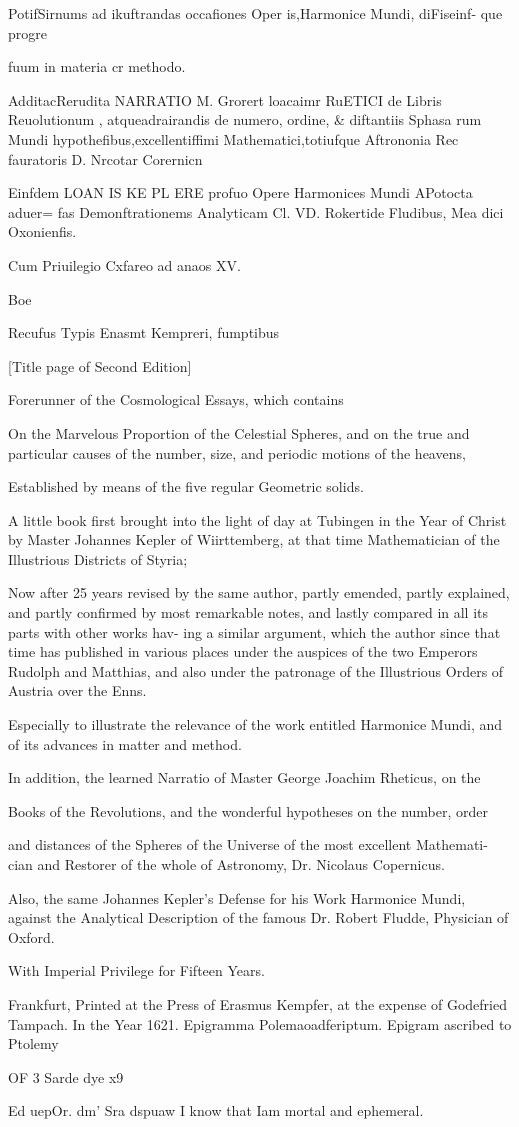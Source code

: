 \documentclass{article}
\begin{document}
PotifSirnums ad ikuftrandas occafiones Oper is,Harmonice Mundi, diFiseinf-
que progre{fuum in materia cr methodo.

AdditacRerudita NARRATIO M. Grorert loacaimr RuETICI de
Libris Reuolutionum , atqueadrairandis de numero, ordine, & diftantiis Sphasa
rum Mundi hypothefibus,excellentiffimi Mathematici,totiufque Aftrononia Rec
fauratoris D. Nrcotar Corernicn


Einfdem LOAN IS KE PL ERE profuo Opere Harmonices Mundi APotocta aduer=
fas Demonftrationems Analyticam Cl. VD. Rokertide Fludibus, Mea
dici Oxonienfis.

Cum Priuilegio Cxfareo ad anaos XV.

Boe

Recufus Typis Enasmt Kempreri, fumptibus


[Title page of Second Edition]

Forerunner of the Cosmological Essays, which contains


On the Marvelous Proportion of the Celestial Spheres, and on
the true and particular causes of the number, size, and periodic
motions of the heavens,

Established by means of the five regular Geometric solids.

A little book first brought into the light of day at Tubingen in the Year of Christ
by
Master Johannes Kepler of Wiirttemberg, at that time
Mathematician of the Illustrious Districts of Styria;

Now after 25 years revised by the same author, partly emended,
partly explained, and partly confirmed by most remarkable
notes, and lastly compared in all its parts with other works hav-
ing a similar argument, which the author since that time has
published in various places under the auspices of the two
Emperors Rudolph and Matthias, and also under the patronage
of the Illustrious Orders of Austria over the Enns.

Especially to illustrate the relevance of the work entitled Harmonice Mundi,
and of its advances in matter and method.

In addition, the learned Narratio of Master George Joachim Rheticus, on the

Books of the Revolutions, and the wonderful hypotheses on the number, order

and distances of the Spheres of the Universe of the most excellent Mathemati-
cian and Restorer of the whole of Astronomy, Dr. Nicolaus Copernicus.

Also, the same Johannes Kepler’s Defense for his Work Harmonice Mundi,
against the Analytical Description of the famous Dr. Robert Fludde,
Physician of Oxford.

With Imperial Privilege for Fifteen Years.

Frankfurt,
Printed at the Press of Erasmus Kempfer, at the expense of
Godefried Tampach.
In the Year 1621.
Epigramma Polemaoadferiptum.
Epigram ascribed to Ptolemy

OF 3 Sarde dye x9} Ed uepOr. dm’ Sra dspuaw I know that Iam mortal and ephemeral.
\end{document}
